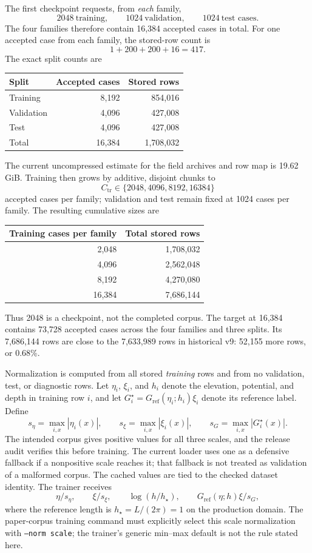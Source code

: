 \documentclass[10pt]{article}
\newcommand{\Gref}{G_{\mathrm{ref}}}
\begin{document}
The first checkpoint requests, from \emph{each} family,
\[
  2048\ \text{training},\qquad
  1024\ \text{validation},\qquad
  1024\ \text{test cases}.
\]
The four families therefore contain 16,384 accepted cases in total.
For one accepted case from each family, the stored-row count is
\[
  1+200+200+16=417.
\]
The exact split counts are
\begin{table}[ht]
  \centering
  \small
  \begin{tabular}{lrr}
    \toprule
    Split & Accepted cases & Stored rows\\
    \midrule
    Training & 8,192 & 854,016\\
    Validation & 4,096 & 427,008\\
    Test & 4,096 & 427,008\\
    \midrule
    Total & 16,384 & 1,708,032\\
    \bottomrule
  \end{tabular}
\end{table}
The current uncompressed estimate for the field archives and row map is
19.62 GiB.
Training then grows by additive, disjoint chunks to
\[
 C_{\mathrm{tr}}\in\{2048,4096,8192,16384\}
\]
accepted cases per family; validation and test remain fixed at 1024 cases per
family.  The resulting cumulative sizes are
\begin{center}
\begin{tabular}{rr}
  \toprule
  Training cases per family & Total stored rows \\
  \midrule
  2,048  & 1,708,032 \\
  4,096  & 2,562,048 \\
  8,192  & 4,270,080 \\
  16,384 & 7,686,144 \\
  \bottomrule
\end{tabular}
\end{center}
Thus 2048 is a checkpoint, not the completed corpus.  The target at 16,384
contains 73,728 accepted cases across the four families and three splits.
Its 7,686,144 rows are close to the 7,633,989 rows in historical v9: 52,155
more rows, or 0.68\%.

Normalization is computed from all stored \emph{training} rows and from no
validation, test, or diagnostic rows.  Let $\eta_i$, $\xi_i$, and $h_i$
denote the elevation, potential, and depth in training row $i$, and let
$G_i^\star=\Gref(\eta_i;h_i)\xi_i$ denote its reference label.  Define
\[
  s_\eta=\max_{i,x}|\eta_i(x)|,\qquad
  s_\xi=\max_{i,x}|\xi_i(x)|,\qquad
  s_G=\max_{i,x}|G_i^\star(x)|.
\]
The intended corpus gives positive values for all three scales, and the
release audit verifies this before training.  The current loader uses one as
a defensive fallback if a nonpositive scale reaches it; that fallback is not
treated as validation of a malformed corpus.  The cached values are tied to
the checked dataset identity.
The trainer receives
\[
  \eta/s_\eta,\qquad
  \xi/s_\xi,\qquad
  \log(h/h_\star),\qquad
  \Gref(\eta;h)\xi/s_G,
\]
where the reference length is $h_\star=L/(2\pi)=1$ on the production domain.
The paper-corpus training command must explicitly select this scale
normalization with \texttt{--norm scale}; the trainer's generic min--max
default is not the rule stated here.
\end{document}
